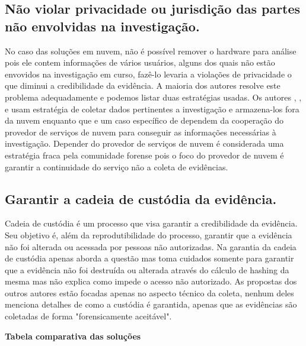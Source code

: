 \documentclass[
	12pt,				%
	openright,			%
	oneside,			%
	a4paper,			%
	english,			%
	brazil,				%
	]{abntex2}
\begin{document}
\subsection{Não violar privacidade ou jurisdição das partes não envolvidas na investigação.}
\label{chp:privacidade-revisao}

No caso das soluções em nuvem, não é possível remover o hardware para análise pois ele contem informações de vários usuários, alguns dos quais não estão envovidos na 
investigação em curso, fazê-lo levaria a violações de privacidade o que diminui a credibilidade da evidência. A maioria dos autores resolve este problema adequadamente 
e podemos listar duas estratégias usadas. Os autores \cite{Reichert2015}, \cite{George2012}, \cite{Poisel2013} e \cite{Dykstra2013} usam estratégia de coletar dados 
pertinentes a investigação e armazena-los fora da nuvem enquanto que \cite{Sang2013} e um caso específico de \cite{George2012} dependem da cooperação do provedor de 
serviços de nuvem para conseguir as informações necessárias à investigação. Depender do provedor de serviços de nuvem é considerada uma estratégia fraca pela comunidade 
forense pois o foco do provedor de nuvem é garantir a continuidade do serviço não a coleta de evidências.

\subsection{Garantir a cadeia de custódia da evidência.}
\label{chp:custodia-revisao}

Cadeia de custódia é um processo que visa garantir a credibilidade da evidência. Seu objetivo é, além da reprodutibilidade do processo, garantir que a evidência não 
foi alterada ou acessada por pessoas não autorizadas. Na garantia da cadeia de custódia apenas \cite{Sang2013} aborda a questão mas toma cuidados somente para  
garantir que a evidência não foi destruída ou alterada através do cálculo de hashing da mesma mas não explica como impede o acesso não autorizado. 
As propostas dos outros autores estão focadas apenas no aspecto técnico da coleta, nenhum deles menciona detalhes de como a custódia é garantida, apenas que as 
evidências são coletadas de forma "forensicamente aceitável".

\textbf{Tabela comparativa das soluções}
\end{document}
